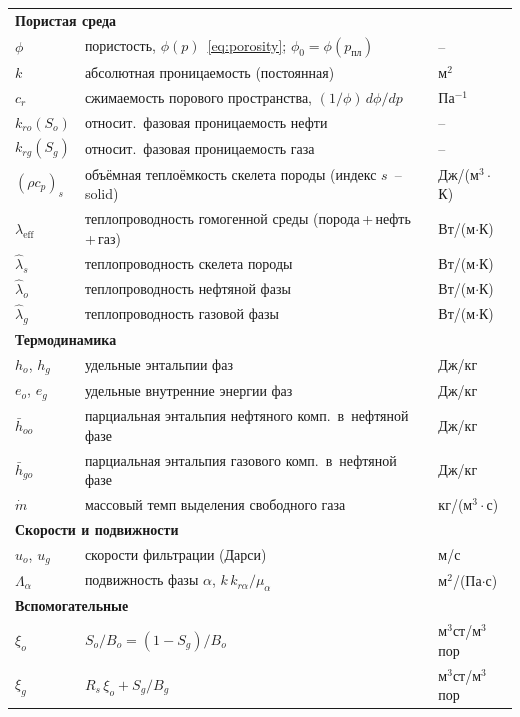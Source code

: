\documentclass[12pt,a4paper]{article}
\newcommand{\ppl}{p_{\text{пл}}}
\newcommand{\xio}{\xi_o}
\newcommand{\mdot}{\dot{m}}
\newcommand{\leff}{\lambda_{\mathrm{eff}}}
\begin{document}
\begin{longtable}{lll}
\multicolumn{3}{l}{\textbf{Пористая среда}} \\
$\phi$        & пористость, $\phi(p)$~\eqref{eq:porosity}; $\phi_0 = \phi(\ppl)$ & --\\
$k$           & абсолютная проницаемость (постоянная)     & м$^2$ \\
$c_r$         & сжимаемость порового пространства, $(1/\phi)\,d\phi/dp$ & Па$^{-1}$ \\
$k_{ro}(S_o)$ & относит.\ фазовая проницаемость нефти    & --\\
$k_{rg}(S_g)$ & относит.\ фазовая проницаемость газа     & --\\
$(\rho c_p)_s$& объёмная теплоёмкость скелета породы (индекс $s$~-- solid) & Дж/(м$^3\cdot$К) \\
$\leff$       & теплопроводность гомогенной среды (порода\,+\,нефть\,+\,газ) & Вт/(м$\cdot$К) \\
$\hat\lambda_s$   & теплопроводность скелета породы       & Вт/(м$\cdot$К) \\
$\hat\lambda_o$   & теплопроводность нефтяной фазы         & Вт/(м$\cdot$К) \\
$\hat\lambda_g$   & теплопроводность газовой фазы           & Вт/(м$\cdot$К) \\

\multicolumn{3}{l}{\textbf{Термодинамика}} \\
$h_o$, $h_g$  & удельные энтальпии фаз                    & Дж/кг \\
$e_o$, $e_g$  & удельные внутренние энергии фаз           & Дж/кг \\
$\bar{h}_{oo}$& парциальная энтальпия нефтяного комп.\ в~нефтяной фазе & Дж/кг \\
$\bar{h}_{go}$& парциальная энтальпия газового комп.\ в~нефтяной фазе  & Дж/кг \\
$\mdot$       & массовый темп выделения свободного газа   & кг/(м$^3\cdot$с) \\

\multicolumn{3}{l}{\textbf{Скорости и подвижности}} \\
$u_o$, $u_g$  & скорости фильтрации (Дарси)              & м/с \\
$\Lambda_\alpha$ & подвижность фазы $\alpha$, $k\,k_{r\alpha}/\mu_\alpha$ & м$^2$/(Па$\cdot$с) \\

\multicolumn{3}{l}{\textbf{Вспомогательные}} \\
$\xio$        & $S_o/B_o = (1-S_g)/B_o$                  & м$^3$ст/м$^3$пор \\
$\xi_g$       & $R_s\,\xio + S_g/B_g$                    & м$^3$ст/м$^3$пор \\


\end{longtable}
\end{document}
